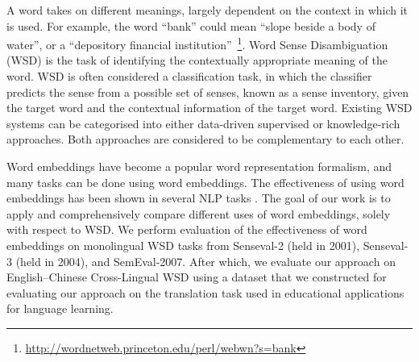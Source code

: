   

A word takes on different meanings, largely dependent on the context
in which it is used. For example, the word ``bank'' could mean ``slope
beside a body of water'', or a ``depository financial
institution''~\footnote{\url{http://wordnetweb.princeton.edu/perl/webwn?s=bank}}. Word
Sense Disambiguation (WSD) is the task of identifying the contextually
appropriate meaning of the word. WSD is often considered a
classification task, in which the classifier predicts the sense from a
possible set of senses, known as a sense inventory, given the target
word and the contextual information of the target word. Existing WSD
systems can be categorised into either data-driven supervised or
knowledge-rich approaches. Both approaches are considered to be
complementary to each other.

Word embeddings have become a popular word representation formalism,
and many tasks can be done using word embeddings. The effectiveness of
using word embeddings has been shown in
several NLP tasks \cite{Turian10wordrepresentations}. The goal of our
work is to apply and comprehensively compare different uses of word
embeddings, solely with respect to WSD. We perform evaluation of the
effectiveness of word embeddings on monolingual WSD tasks from
Senseval-2 (held in 2001), Senseval-3 (held in 2004), and
SemEval-2007. After which, we evaluate our approach on English--Chinese
Cross-Lingual WSD using a dataset that we constructed for %
evaluating our approach on the translation task used in educational
applications for language learning. %

